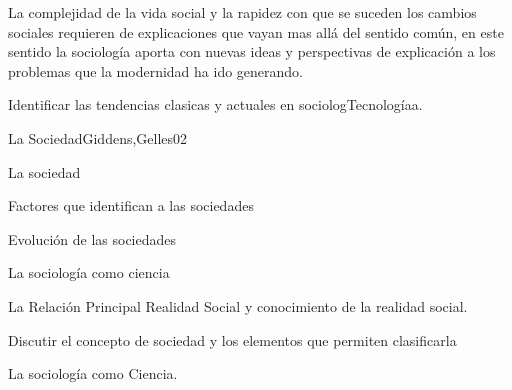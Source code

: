 \begin{syllabus}


\begin{justification}
La complejidad de la vida social y la rapidez con que se suceden los cambios sociales requieren 
de explicaciones que vayan mas allá del sentido común, en este sentido la sociología 
aporta con nuevas ideas y perspectivas de explicación a los problemas que la modernidad 
ha ido generando.
\end{justification}

\begin{goals}
\item Identificar las tendencias clasicas y actuales en sociologTecnologíaa.
\end{goals}

\begin{outcomes}
\end{outcomes}

\begin{unit}{La Sociedad}{Giddens,Gelles}{0}{2}
    \begin{topics}
      \item La sociedad
      \item Factores que identifican a las sociedades
      \item Evolución de las sociedades
      \item La sociología como ciencia
      \item La Relación Principal Realidad Social y conocimiento de la realidad social.
    \end{topics}
    \begin{unitgoals}
      \item Discutir el concepto de sociedad y los elementos que permiten clasificarla
      \item La sociología como Ciencia.
    \end{unitgoals}
\end{unit}


\end{syllabus}
